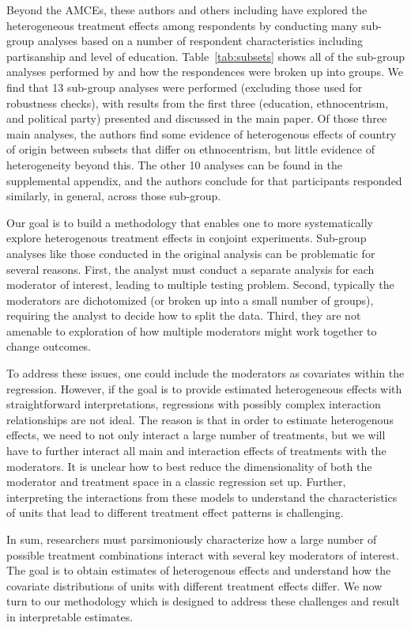 \documentclass[11pt]{article}
\begin{document}
Beyond the AMCEs, these authors and others including
\citet{newman2019economic} have explored the heterogeneous treatment
effects among respondents by conducting many sub-group analyses based
on a number of respondent characteristics including partisanship and
level of education.  Table~\ref{tab:subsets} shows all of the
sub-group analyses performed by \cite{hainmueller2015hidden} and how
the respondences were broken up into groups.  We find that 13
sub-group analyses were performed (excluding those used for robustness
checks), with results from the first three (education, ethnocentrism,
and political party) presented and discussed in the main paper.  Of
those three main analyses, the authors find some evidence of
heterogenous effects of country of origin between subsets that differ
on ethnocentrism, but little evidence of heterogeneity beyond this.
The other 10 analyses can be found in the supplemental appendix, and
the authors conclude for that participants responded similarly, in
general, across those sub-group.

Our goal is to build a methodology that enables one to more
systematically explore heterogenous treatment effects in conjoint
experiments.  Sub-group analyses like those conducted in the original
analysis can be problematic for several reasons.  First, the analyst
must conduct a separate analysis for each moderator of interest,
leading to multiple testing problem.  Second, typically the moderators
are dichotomized (or broken up into a small number of groups),
requiring the analyst to decide how to split the data.  Third, they are
not amenable to exploration of how multiple moderators might work
together to change outcomes.

To address these issues, one could include the moderators as
covariates within the regression.  However, if the goal is to provide
estimated heterogeneous effects with straightforward interpretations,
regressions with possibly complex interaction relationships are not
ideal.  The reason is that in order to estimate heterogenous effects,
we need to not only interact a large number of treatments, but we will
have to further interact all main and interaction effects of
treatments with the moderators.  It is unclear how to best reduce the
dimensionality of both the moderator and treatment space in a classic
regression set up.  Further, interpreting the interactions from these
models to understand the characteristics of units that lead to
different treatment effect patterns is challenging.

In sum, researchers must parsimoniously characterize how a large
number of possible treatment combinations interact with several key
moderators of interest.  The goal is to obtain estimates of
heterogenous effects and understand how the covariate distributions of
units with different treatment effects differ.  We now turn to our
methodology which is designed to address these challenges and result
in interpretable estimates.
\end{document}
